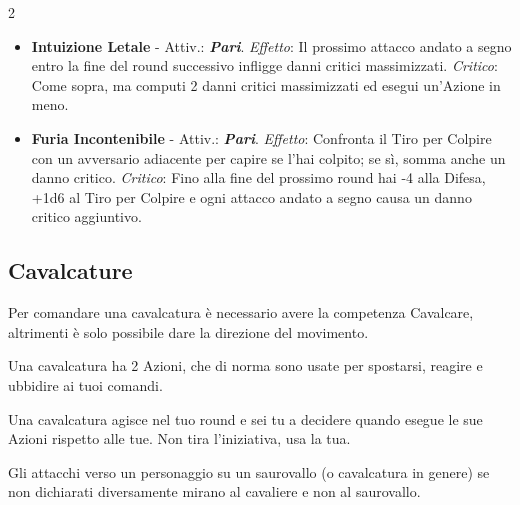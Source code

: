 \begin{multicols}{2}
\begin{itemize}[leftmargin=*]
\begin{itemize}[leftmargin=*]
		\item \textbf{Intuizione Letale} - Attiv.: \textbf{\emph{Pari}}. \emph{Effetto}: Il prossimo attacco andato a segno entro la fine del round successivo infligge danni critici massimizzati. \emph{Critico}: Come sopra, ma computi 2 danni critici massimizzati ed esegui un'Azione in meno.

		\item \textbf{Furia Incontenibile} - Attiv.: \textbf{\emph{Pari}}. \emph{Effetto}: Confronta il Tiro per Colpire con un avversario adiacente per capire se l'hai colpito; se sì, somma anche un danno critico. \emph{Critico}: Fino alla fine del prossimo round hai -4 alla Difesa, +1d6 al Tiro per Colpire e ogni attacco andato a segno causa un danno critico aggiuntivo.
	\end{itemize}

\end{itemize}

%
%




%

\subsection{Cavalcature}\label{cavalcature}\hypertarget{cavalcare}{}\label{cavalcare}



Per comandare una cavalcatura è necessario avere la competenza Cavalcare, altrimenti è solo possibile dare la direzione del movimento.

Una cavalcatura ha 2 Azioni, che di norma sono usate per spostarsi, reagire e ubbidire ai tuoi comandi.

Una cavalcatura agisce nel tuo round e sei tu a decidere quando esegue le sue Azioni rispetto alle tue. Non tira l'iniziativa, usa la tua.

Gli attacchi verso un personaggio su un saurovallo (o cavalcatura in genere) se non dichiarati diversamente mirano al cavaliere e non al saurovallo.


\end{multicols}
